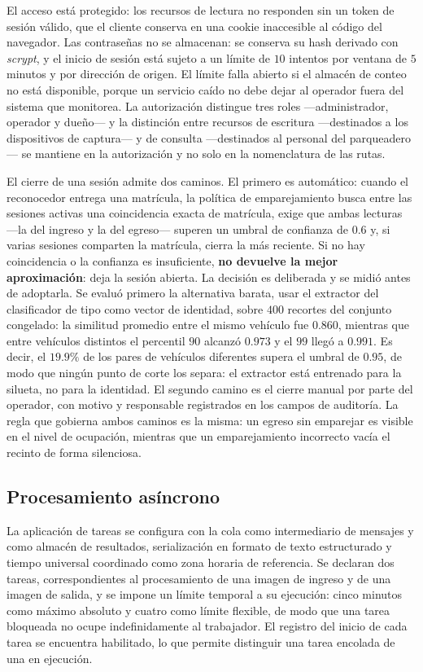 El acceso está protegido: los recursos de lectura no responden sin un token de
sesión válido, que el cliente conserva en una cookie inaccesible al código del
navegador. Las contraseñas no se almacenan: se conserva su hash derivado con
\textit{scrypt}, y el inicio de sesión está sujeto a un límite de $10$ intentos
por ventana de $5$ minutos y por dirección de origen. El límite falla abierto si
el almacén de conteo no está disponible, porque un servicio caído no debe dejar al
operador fuera del sistema que monitorea. La autorización distingue tres roles
---administrador, operador y dueño--- y la distinción entre recursos de
escritura ---destinados a los dispositivos de captura--- y de consulta
---destinados al personal del parqueadero--- se mantiene en la autorización y no
solo en la nomenclatura de las rutas.

El cierre de una sesión admite dos caminos. El primero es automático: cuando el
reconocedor entrega una matrícula, la política de emparejamiento busca entre las
sesiones activas una coincidencia exacta de matrícula, exige que ambas lecturas
---la del ingreso y la del egreso--- superen un umbral de confianza de $0{.}6$ y,
si varias sesiones comparten la matrícula, cierra la más reciente. Si no hay
coincidencia o la confianza es insuficiente, \textbf{no devuelve la mejor
aproximación}: deja la sesión abierta. La decisión es deliberada y se midió antes
de adoptarla. Se evaluó primero la alternativa barata, usar el extractor del
clasificador de tipo como vector de identidad, sobre $400$ recortes del conjunto
congelado: la similitud promedio entre el mismo vehículo fue $0{.}860$, mientras
que entre vehículos distintos el percentil $90$ alcanzó $0{.}973$ y el $99$
llegó a $0{.}991$. Es decir, el $19{.}9\%$ de los pares de vehículos diferentes
supera el umbral de $0{.}95$, de modo que ningún punto de corte los separa: el
extractor está entrenado para la silueta, no para la identidad. El segundo camino
es el cierre manual por parte del operador, con motivo y responsable registrados
en los campos de auditoría. La regla que gobierna ambos caminos es la misma: un
egreso sin emparejar es visible en el nivel de ocupación, mientras que un
emparejamiento incorrecto vacía el recinto de forma silenciosa.

\subsection{Procesamiento asíncrono}

La aplicación de tareas se configura con la cola como intermediario de mensajes y
como almacén de resultados, serialización en formato de texto estructurado y
tiempo universal coordinado como zona horaria de referencia. Se declaran dos
tareas, correspondientes al procesamiento de una imagen de ingreso y de una
imagen de salida, y se impone un límite temporal a su ejecución: cinco minutos
como máximo absoluto y cuatro como límite flexible, de modo que una tarea
bloqueada no ocupe indefinidamente al trabajador. El registro del inicio de cada
tarea se encuentra habilitado, lo que permite distinguir una tarea encolada de
una en ejecución.

